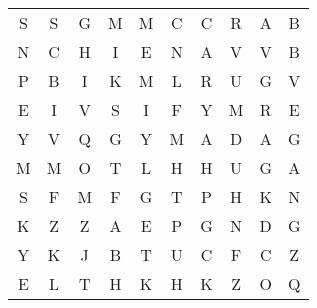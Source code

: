 \documentclass{standalone}
\begin{document}
\begin{center}
\renewcommand{\arraystretch}{1.5}{
\noindent\begin{tabular}{cccccccccc}S & S & G & M & M & C & C & R & A & B \\ 
N & C & H & I & E & N & A & V & V & B \\ 
P & B & I & K & M & L & R & U & G & V \\ 
E & I & V & S & I & F & Y & M & R & E \\ 
Y & V & Q & G & Y & M & A & D & A & G \\ 
M & M & O & T & L & H & H & U & G & A \\ 
S & F & M & F & G & T & P & H & K & N \\ 
K & Z & Z & A & E & P & G & N & D & G \\ 
Y & K & J & B & T & U & C & F & C & Z \\ 
E & L & T & H & K & H & K & Z & O & Q
\end{tabular}
}
\end{center}
\end{document}
